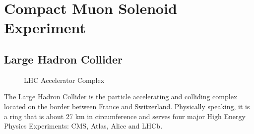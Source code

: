 \section{Compact Muon Solenoid Experiment} \label{section:higgs_cms}

\subsection{Large Hadron Collider} \label{subsection:higgs_cms_lhc}
\begin{figure}[hbp]
    \centering
    \caption{LHC Accelerator Complex}
    \label{fig:higgs_cms_lhc}
 \end{figure}

 The Large Hadron Collider is the particle accelerating and colliding complex located on the border between France and Switzerland. Physically speaking, it is a ring that is about 27 km in circumference and serves four major High Energy Physics Experiments: CMS, Atlas, Alice and LHCb.

